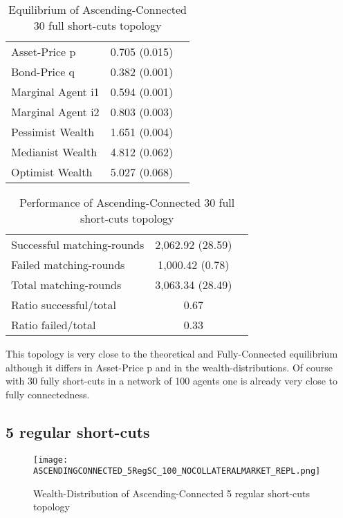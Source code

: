 \documentclass[Bachelorarbeit.tex]{subfiles}
\begin{document}
\begin{table}[H]
	\caption{Equilibrium of Ascending-Connected 30 full short-cuts topology}
	\centering
	\begin{tabular} { l c r }
		\hline
		Asset-Price p & 0.705 (0.015) \\
		Bond-Price q & 0.382 (0.001) \\
		Marginal Agent i1 & 0.594 (0.001) \\
		Marginal Agent i2 & 0.803 (0.003) \\
		\hline
		Pessimist Wealth & 1.651 (0.004) \\
		Medianist Wealth & 4.812 (0.062) \\
		Optimist Wealth & 5.027 (0.068) \\
		\hline
	\end{tabular}
\end{table} 

\begin{table}[H]
	\caption{Performance of Ascending-Connected 30 full short-cuts topology}
	\centering
	\begin{tabular} { l c r }
		\hline
		Successful matching-rounds & 2,062.92 (28.59) \\
		Failed matching-rounds & 1,000.42 (0.78) \\
		Total matching-rounds & 3,063.34 (28.49) \\
		\hline
		Ratio successful/total & 0.67 \\
		Ratio failed/total & 0.33 \\
		\hline
	\end{tabular}
\end{table}

This topology is very close to the theoretical and Fully-Connected equilibrium although it differs in Asset-Price p and in the wealth-distributions. Of course with 30 fully short-cuts in a network of 100 agents one is already very close to fully connectedness.

\subsection{5 regular short-cuts}
\begin{figure}[H]
	\centering
  \texttt{[image: ASCENDINGCONNECTED\_5RegSC\_100\_NOCOLLATERALMARKET\_REPL.png]}
	\caption{Wealth-Distribution of Ascending-Connected 5 regular short-cuts topology}
	\label{fig:wealth_ASCENDINGCONNECTED_5RegSC_100_NOCOLLATERALMARKET_REPL}
\end{figure}
\end{document}
